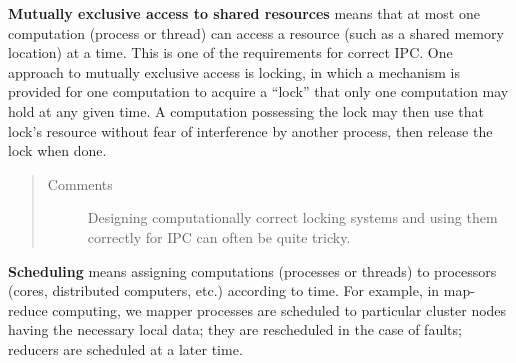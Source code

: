 \documentclass[letterpaper,10pt,openany,oneside]{sphinxmanual}
\begin{document}
\textbf{Mutually exclusive access to shared resources} means that at most one computation (process or thread) can access a resource (such as a shared memory location) at a time. This is one of the requirements for correct IPC.  One approach to mutually exclusive access is locking, in which a mechanism is provided for one computation to acquire a ``lock'' that only one computation may hold at any given time. A computation possessing the lock may then use that lock's resource without fear of interference by another process, then release the lock when done.
\begin{quote}\begin{description}
\item[{Comments}] \leavevmode
Designing computationally correct locking systems and using them correctly for IPC can often be quite tricky.

\end{description}\end{quote}

\textbf{Scheduling} means assigning computations (processes or threads) to processors (cores, distributed computers, etc.) according to time. For example, in map-reduce computing, we mapper processes are scheduled to particular cluster nodes having the necessary local data; they are rescheduled in the case of faults; reducers are scheduled at a later time.



\renewcommand{\indexname}{Index}
\printindex
\end{document}
